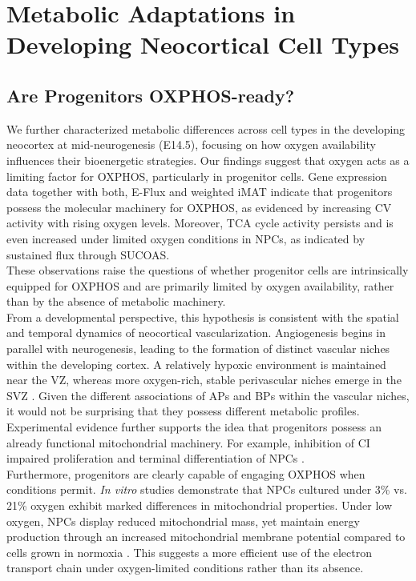 \section{Metabolic Adaptations in Developing Neocortical Cell Types}

\subsection{Are Progenitors OXPHOS-ready?}
We further characterized metabolic differences across cell types in the developing neocortex at mid-neurogenesis (E14.5), focusing on how oxygen availability influences their bioenergetic strategies. Our findings suggest that oxygen acts as a limiting factor for OXPHOS, particularly in progenitor cells. Gene expression data together with both, E-Flux and weighted iMAT indicate that progenitors possess the molecular machinery for OXPHOS, as evidenced by increasing CV activity with rising oxygen levels. Moreover, TCA cycle activity persists and is even increased under limited oxygen conditions in NPCs, as indicated by sustained flux through SUCOAS.
\\

These observations raise the questions of whether progenitor cells are intrinsically equipped for OXPHOS and are primarily limited by oxygen availability, rather than by the absence of metabolic machinery. 
\\

From a developmental perspective, this hypothesis is consistent with the spatial and temporal dynamics of neocortical vascularization. Angiogenesis begins in parallel with neurogenesis, leading to the formation of distinct vascular niches within the developing cortex. A relatively hypoxic environment is maintained near the VZ, whereas more oxygen-rich, stable perivascular niches emerge in the SVZ \citep{komabayashi-suzukiSpatiotemporallyDependentVascularization2019}.
Given the different associations of APs and BPs within the vascular niches, it would not be surprising that they possess different metabolic profiles. 
\\

Experimental evidence further supports the idea that progenitors possess an already functional mitochondrial machinery. For example, inhibition of  CI impaired proliferation and terminal differentiation of NPCs \citep{CABELLO-RIVERAMitochondrialComplexFunction2019,vandenameeleNeuralStemCell2019}.
\\

Furthermore, progenitors are clearly capable of engaging OXPHOS when conditions permit. 
\textit{In vitro} studies demonstrate that NPCs cultured under 3\% vs. 21\% oxygen  exhibit marked differences in mitochondrial properties. Under low oxygen, NPCs display reduced mitochondrial mass, yet maintain energy production through an increased mitochondrial membrane potential compared to cells grown in normoxia \citep{lagesLowOxygenAlters2015}.
This suggests a more efficient use of the electron transport chain under oxygen-limited conditions rather than its absence.
\\

